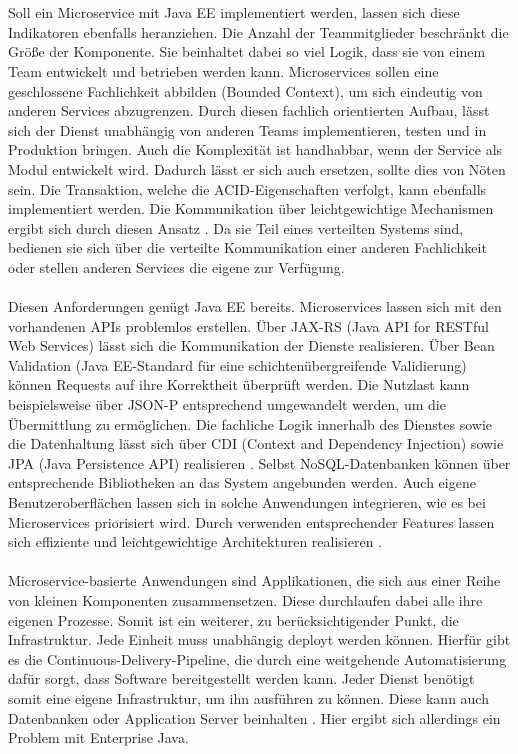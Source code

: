 \\ \\Soll ein Microservice mit Java EE implementiert werden, lassen sich diese Indikatoren ebenfalls heranziehen. Die Anzahl der Teammitglieder beschränkt die Größe der Komponente. Sie beinhaltet dabei so viel Logik, dass sie von einem Team entwickelt und betrieben werden kann. Microservices sollen eine geschlossene Fachlichkeit abbilden (Bounded Context), um sich eindeutig von anderen Services abzugrenzen. Durch diesen fachlich orientierten Aufbau, lässt sich der Dienst unabhängig von anderen Teams implementieren, testen und in Produktion bringen. Auch die Komplexität ist handhabbar, wenn der Service als Modul entwickelt wird. Dadurch lässt er sich auch ersetzen, sollte dies von Nöten sein. Die Transaktion, welche die ACID-Eigenschaften verfolgt, kann ebenfalls implementiert werden. Die Kommunikation über leichtgewichtige Mechanismen ergibt sich durch diesen Ansatz \cite{EberhardWolff.2015}. Da sie Teil eines verteilten Systems sind, bedienen sie sich über die verteilte Kommunikation einer anderen Fachlichkeit oder stellen anderen Services die eigene zur Verfügung. \\ \\
Diesen Anforderungen genügt Java EE bereits. Microservices lassen sich mit den vorhandenen APIs problemlos erstellen. Über JAX-RS (Java API for RESTful Web Services) lässt sich die Kommunikation der Dienste realisieren. Über Bean Validation (Java EE-Standard für eine schichtenübergreifende Validierung) können Requests auf ihre Korrektheit überprüft werden. Die Nutzlast kann beispielsweise über JSON-P entsprechend umgewandelt werden, um die Übermittlung zu ermöglichen. Die fachliche Logik innerhalb des Dienstes sowie die Datenhaltung lässt sich über CDI (Context and Dependency Injection) sowie JPA (Java Persistence API) realisieren \cite{LarsRowekamp.2017d}. Selbst NoSQL-Datenbanken können über entsprechende Bibliotheken an das System angebunden werden. Auch eigene Benutzeroberflächen lassen sich in solche Anwendungen integrieren, wie es bei Microservices priorisiert wird. Durch verwenden entsprechender Features lassen sich effiziente und leichtgewichtige Architekturen realisieren \cite{jaxcenter.2016}.\\ \\
Microservice-basierte Anwendungen sind Applikationen, die sich aus einer Reihe von kleinen Komponenten zusammensetzen. Diese durchlaufen dabei alle ihre eigenen Prozesse. Somit ist ein weiterer, zu berücksichtigender Punkt, die Infrastruktur. Jede Einheit muss unabhängig deployt werden können. Hierfür gibt es die Continuous-Delivery-Pipeline, die durch eine weitgehende Automatisierung dafür sorgt, dass Software bereitgestellt werden kann. Jeder Dienst benötigt somit eine eigene Infrastruktur, um ihn ausführen zu können. Diese kann auch Datenbanken oder Application Server beinhalten \cite{EberhardWolff.2015}. Hier ergibt sich allerdings ein Problem mit Enterprise Java.

